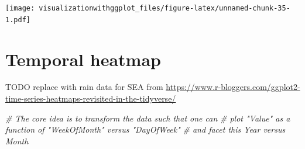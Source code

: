 \documentclass[]{krantz}
\makeatletter
\newenvironment{Shaded}{\begin{snugshade}}{\end{snugshade}}
\newcommand{\CommentTok}[1]{\textcolor[rgb]{0.56,0.35,0.01}{\textit{#1}}}
\newenvironment{kframe}{%
\medskip{}
\setlength{\fboxsep}{.8em}
 \def\at@end@of@kframe{}%
 \ifinner\ifhmode%
  \def\at@end@of@kframe{\end{minipage}}%
  \begin{minipage}{\columnwidth}%
 \fi\fi%
 \def\FrameCommand##1{\hskip\@totalleftmargin \hskip-\fboxsep
 \colorbox{shadecolor}{##1}\hskip-\fboxsep
     \hskip-\linewidth \hskip-\@totalleftmargin \hskip\columnwidth}%
 \MakeFramed {\advance\hsize-\width
   \@totalleftmargin\z@ \linewidth\hsize
   \@setminipage}}%
 {\par\unskip\endMakeFramed%
 \at@end@of@kframe}
\renewenvironment{Shaded}{\begin{kframe}}{\end{kframe}}
\theoremstyle{definition}
\theoremstyle{definition}
\theoremstyle{definition}
\theoremstyle{remark}
\makeatother
\begin{document}
\texttt{[image: visualizationwithggplot\_files/figure-latex/unnamed-chunk-35-1.pdf]}

\section{Temporal heatmap}\label{temporal-heatmap}

TODO replace with rain data for SEA from
\url{https://www.r-bloggers.com/ggplot2-time-series-heatmaps-revisited-in-the-tidyverse/}

\begin{Shaded}
\begin{Highlighting}[]
\CommentTok{# The core idea is to transform the data such that one can}
\CommentTok{# plot "Value" as a function of "WeekOfMonth" versus "DayOfWeek"}
\CommentTok{# and facet this Year versus Month}


\end{Highlighting}
\end{Shaded}
\end{document}
